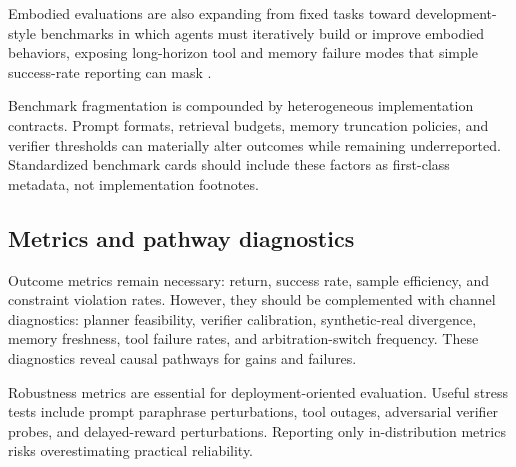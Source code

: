 ﻿\documentclass[conference]{IEEEtran}
\begin{document}
Embodied evaluations are also expanding from fixed tasks toward development-style benchmarks in which agents must iteratively build or improve embodied behaviors, exposing long-horizon tool and memory failure modes that simple success-rate reporting can mask \cite{arxiv_p_2601_21570}.

Benchmark fragmentation is compounded by heterogeneous implementation contracts. Prompt formats, retrieval budgets, memory truncation policies, and verifier thresholds can materially alter outcomes while remaining underreported. Standardized benchmark cards should include these factors as first-class metadata, not implementation footnotes.

\subsection{Metrics and pathway diagnostics}
Outcome metrics remain necessary: return, success rate, sample efficiency, and constraint violation rates. However, they should be complemented with channel diagnostics:
planner feasibility, verifier calibration, synthetic-real divergence, memory freshness, tool failure rates, and arbitration-switch frequency. These diagnostics reveal causal pathways for gains and failures.

Robustness metrics are essential for deployment-oriented evaluation. Useful stress tests include prompt paraphrase perturbations, tool outages, adversarial verifier probes, and delayed-reward perturbations. Reporting only in-distribution metrics risks overestimating practical reliability.
\end{document}
